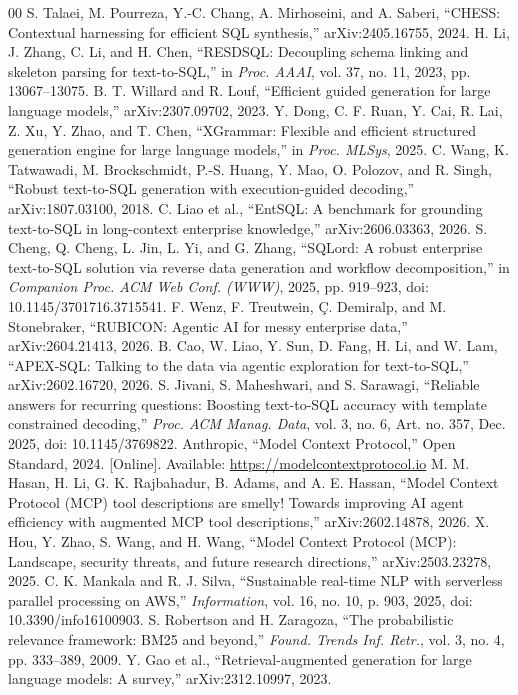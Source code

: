 \begin{thebibliography}{00}
 S. Talaei, M. Pourreza, Y.-C. Chang, A. Mirhoseini, and A. Saberi, ``CHESS: Contextual harnessing for efficient SQL synthesis,'' arXiv:2405.16755, 2024.
 H. Li, J. Zhang, C. Li, and H. Chen, ``RESDSQL: Decoupling schema linking and skeleton parsing for text-to-SQL,'' in \emph{Proc. AAAI}, vol. 37, no. 11, 2023, pp. 13067--13075.
 B. T. Willard and R. Louf, ``Efficient guided generation for large language models,'' arXiv:2307.09702, 2023.
 Y. Dong, C. F. Ruan, Y. Cai, R. Lai, Z. Xu, Y. Zhao, and T. Chen, ``XGrammar: Flexible and efficient structured generation engine for large language models,'' in \emph{Proc. MLSys}, 2025.
 C. Wang, K. Tatwawadi, M. Brockschmidt, P.-S. Huang, Y. Mao, O. Polozov, and R. Singh, ``Robust text-to-SQL generation with execution-guided decoding,'' arXiv:1807.03100, 2018.
 C. Liao et al., ``EntSQL: A benchmark for grounding text-to-SQL in long-context enterprise knowledge,'' arXiv:2606.03363, 2026.
 S. Cheng, Q. Cheng, L. Jin, L. Yi, and G. Zhang, ``SQLord: A robust enterprise text-to-SQL solution via reverse data generation and workflow decomposition,'' in \emph{Companion Proc. ACM Web Conf. (WWW)}, 2025, pp. 919--923, doi: 10.1145/3701716.3715541.
 F. Wenz, F. Treutwein, \c{C}. Demiralp, and M. Stonebraker, ``RUBICON: Agentic AI for messy enterprise data,'' arXiv:2604.21413, 2026.
 B. Cao, W. Liao, Y. Sun, D. Fang, H. Li, and W. Lam, ``APEX-SQL: Talking to the data via agentic exploration for text-to-SQL,'' arXiv:2602.16720, 2026.
 S. Jivani, S. Maheshwari, and S. Sarawagi, ``Reliable answers for recurring questions: Boosting text-to-SQL accuracy with template constrained decoding,'' \emph{Proc. ACM Manag. Data}, vol. 3, no. 6, Art. no. 357, Dec. 2025, doi: 10.1145/3769822.
 Anthropic, ``Model Context Protocol,'' Open Standard, 2024. [Online]. Available: \url{https://modelcontextprotocol.io}
 M. M. Hasan, H. Li, G. K. Rajbahadur, B. Adams, and A. E. Hassan, ``Model Context Protocol (MCP) tool descriptions are smelly! Towards improving AI agent efficiency with augmented MCP tool descriptions,'' arXiv:2602.14878, 2026.
 X. Hou, Y. Zhao, S. Wang, and H. Wang, ``Model Context Protocol (MCP): Landscape, security threats, and future research directions,'' arXiv:2503.23278, 2025.
 C. K. Mankala and R. J. Silva, ``Sustainable real-time NLP with serverless parallel processing on AWS,'' \emph{Information}, vol. 16, no. 10, p. 903, 2025, doi: 10.3390/info16100903.
 S. Robertson and H. Zaragoza, ``The probabilistic relevance framework: BM25 and beyond,'' \emph{Found. Trends Inf. Retr.}, vol. 3, no. 4, pp. 333--389, 2009.
 Y. Gao et al., ``Retrieval-augmented generation for large language models: A survey,'' arXiv:2312.10997, 2023.
\end{thebibliography}
